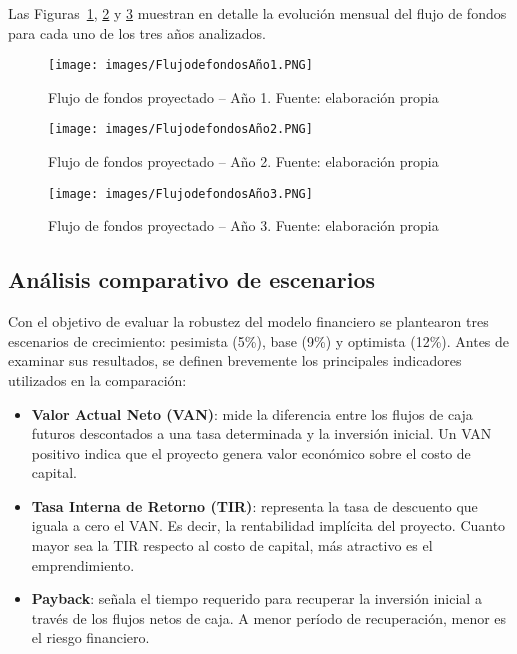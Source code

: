 Las Figuras~\ref{fig:flujo-anio1}, \ref{fig:flujo-anio2} y \ref{fig:flujo-anio3} muestran en detalle la evolución mensual del flujo de fondos para cada uno de los tres años analizados.

\begin{figure}[!htbp]
  \centering
  \texttt{[image: images/FlujodefondosAño1.PNG]}
  \caption{Flujo de fondos proyectado -- Año 1. Fuente: elaboración propia}
  \label{fig:flujo-anio1}
\end{figure}

\begin{figure}[!htbp]
  \centering
  \texttt{[image: images/FlujodefondosAño2.PNG]}
  \caption{Flujo de fondos proyectado -- Año 2. Fuente: elaboración propia}
  \label{fig:flujo-anio2}
\end{figure}

\begin{figure}[!htbp]
  \centering
  \texttt{[image: images/FlujodefondosAño3.PNG]}
  \caption{Flujo de fondos proyectado -- Año 3. Fuente: elaboración propia}
  \label{fig:flujo-anio3}
\end{figure}



\subsection{Análisis comparativo de escenarios}

Con el objetivo de evaluar la robustez del modelo financiero se plantearon tres escenarios de crecimiento: pesimista (5\%), base (9\%) y optimista (12\%). Antes de examinar sus resultados, se definen brevemente los principales indicadores utilizados en la comparación:

\begin{itemize}
  \item \textbf{Valor Actual Neto (VAN)}: mide la diferencia entre los flujos de caja futuros descontados a una tasa determinada y la inversión inicial. Un VAN positivo indica que el proyecto genera valor económico sobre el costo de capital.
  \item \textbf{Tasa Interna de Retorno (TIR)}: representa la tasa de descuento que iguala a cero el VAN. Es decir, la rentabilidad implícita del proyecto. Cuanto mayor sea la TIR respecto al costo de capital, más atractivo es el emprendimiento.
  \item \textbf{Payback}: señala el tiempo requerido para recuperar la inversión inicial a través de los flujos netos de caja. A menor período de recuperación, menor es el riesgo financiero.
\end{itemize}


